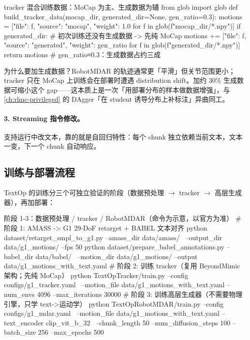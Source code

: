 \begin{codebox}[Python]{tracker 混合训练数据：MoCap 为主、生成数据为辅}
from glob import glob
def build_tracker_data(mocap_dir, generated_dir=None, gen_ratio=0.3):
    motions = [{"file": f, "source": "mocap", "weight": 1.0}
               for f in glob(f"{mocap_dir}/*.npy")]
    if generated_dir:                       # 初次训练还没有生成数据 -> 先纯 MoCap
        motions += [{"file": f, "source": "generated", "weight": gen_ratio}
                    for f in glob(f"{generated_dir}/*.npy")]
    return motions                          # gen_ratio≈0.3：生成数据占约三成
\end{codebox}

为什么要加生成数据？RobotMDAR 的轨迹通常更「平滑」但关节范围更小；tracker 只在 MoCap 上训练会在部署时遭遇 distribution shift。加约 30\% 生成数据可缩小这个 gap——这本质上是一次「用部署分布的样本做数据增强」，与 \cref{ch:rlmc-privileged} 的 DAgger「在 student 诱导分布上补标注」异曲同工。

\paragraph{3. Streaming 指令修改。}支持运行中改文本，靠的就是自回归特性：每个 chunk 独立依赖当前文本，文本一变，下一个 chunk 自动响应。

\subsection{训练与部署流程}
\label{sec:rlmc-mm-textop-flow}

TextOp 的训练分三个可独立验证的阶段（数据预处理 $\to$ tracker $\to$ 高层生成器），再加部署：

\begin{codebox}[bash]{阶段 1-3：数据预处理 / tracker / RobotMDAR（命令为示意，以官方为准）}
# 阶段 1: AMASS -> G1 29-DoF retarget + BABEL 文本对齐
python dataset/retarget_smpl_to_g1.py --amass_dir data/amass/ \
    --output_dir data/g1_motions/ --fps 50
python dataset/prepare_babel_annotations.py --babel_dir data/babel/ \
    --motion_dir data/g1_motions/ --output data/g1_motions_with_text.yaml
# 阶段 2: 训练 tracker（复用 BeyondMimic 架构；先纯 MoCap）
python TextOpTracker/train.py --config configs/g1_tracker.yaml \
    --motion_file data/g1_motions_with_text.yaml --num_envs 4096 --max_iterations 30000
# 阶段 3: 训练高层生成器（不需要物理引擎，只学 text->运动学）
python TextOpRobotMDAR/train.py --config configs/g1_mdar.yaml \
    --motion_file data/g1_motions_with_text.yaml --text_encoder clip_vit_b_32 \
    --chunk_length 50 --num_diffusion_steps 100 --batch_size 256 --max_epochs 500
\end{codebox}

